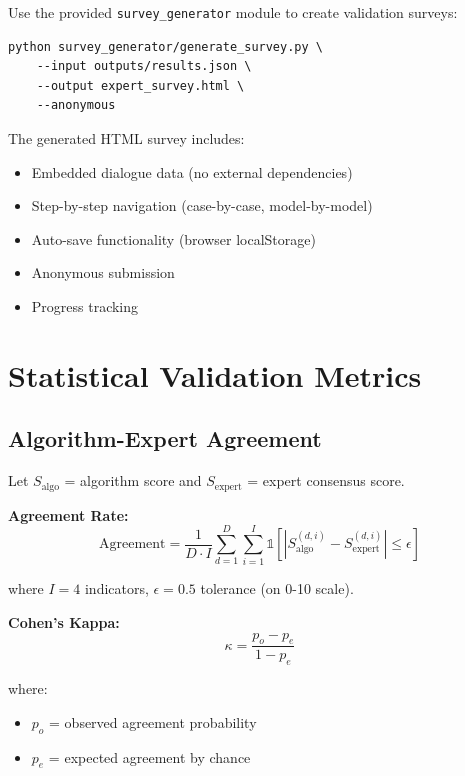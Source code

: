 \documentclass[11pt]{article}
\begin{document}
Use the provided \texttt{survey\_generator} module to create validation surveys:

\begin{verbatim}
python survey_generator/generate_survey.py \
    --input outputs/results.json \
    --output expert_survey.html \
    --anonymous
\end{verbatim}

The generated HTML survey includes:
\begin{itemize}[noitemsep]
    \item Embedded dialogue data (no external dependencies)
    \item Step-by-step navigation (case-by-case, model-by-model)
    \item Auto-save functionality (browser localStorage)
    \item Anonymous submission
    \item Progress tracking
\end{itemize}

\section{Statistical Validation Metrics}

\subsection{Algorithm-Expert Agreement}

Let $S_{\text{algo}}$ = algorithm score and $S_{\text{expert}}$ = expert consensus score.

\textbf{Agreement Rate:}
\begin{equation}
\text{Agreement} = \frac{1}{D \cdot I} \sum_{d=1}^{D} \sum_{i=1}^{I} \mathbb{1}\left[\left|S_{\text{algo}}^{(d,i)} - S_{\text{expert}}^{(d,i)}\right| \leq \epsilon\right]
\end{equation}

where $I = 4$ indicators, $\epsilon = 0.5$ tolerance (on 0-10 scale).

\textbf{Cohen's Kappa:}
\begin{equation}
\kappa = \frac{p_o - p_e}{1 - p_e}
\end{equation}

where:
\begin{itemize}[noitemsep]
    \item $p_o$ = observed agreement probability
    \item $p_e$ = expected agreement by chance
\end{itemize}
\end{document}
